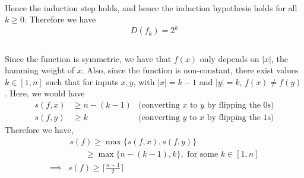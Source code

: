 \documentclass{article}
\begin{document}
\,

Hence the induction step holds, and hence the induction hypothesis holds for all $k \geq 0$. Therefore we have
$$\boxed{D(f_k) = 2^k}$$
\vspace*{-8mm}\begin{flushright}\qedsymbol{}\end{flushright}


\subsection{}

Since the function is symmetric, we have that $f(x)$ only depends on $|x|$, the hamming weight of $x$. Also, since the function is non-constant, there exist values $k \in [1, n]$ such that for inputs $x, y$, with $|x| = k-1$ and $|y| = k $, $f(x) \neq f(y)$. Here, we would have
\begin{align}
	s(f, x) &\geq n - (k - 1)  &\text{(converting $x$ to $y$ by flipping the 0s)} \\
	s(f, y) &\geq k &\text{(converting $y$ to $x$ by flipping the 1s)}
\end{align}
Therefore we have,
\begin{align*}
	 &\,s(f) \geq \max \{ s(f, x), s(f, y) \} \\
	 &\quad\quad\geq \max \{ n - (k - 1), k \}, \text{ for some $k \in [1, n]$} \\
	 \implies &\boxed{s(f) \geq \Big\lceil \frac{n+1}{2} \Big\rceil}
\end{align*}
\vspace*{-6mm}\begin{flushright}\qedsymbol{}\end{flushright}
\end{document}
